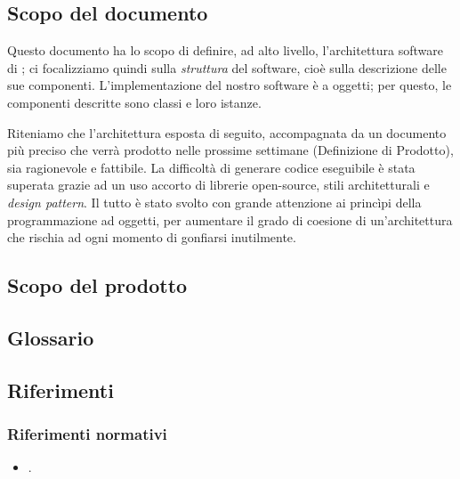 


\subsection{Scopo del documento}
Questo documento ha lo scopo di definire, ad alto livello, l'architettura software di \proj; ci focalizziamo quindi sulla \emph{struttura} del software, cioè sulla descrizione delle sue componenti. L'implementazione del nostro software è a oggetti; per questo, le componenti descritte sono classi e loro istanze.

Riteniamo che l'architettura esposta di seguito, accompagnata da un documento più preciso che verrà prodotto nelle prossime settimane (Definizione di Prodotto), sia ragionevole e fattibile. La difficoltà di generare codice eseguibile è stata superata grazie ad un uso accorto di librerie open-source, stili architetturali e \emph{design pattern}. Il tutto è stato svolto con grande attenzione ai princìpi della programmazione ad oggetti, per aumentare il grado di coesione di un'architettura che rischia ad ogni momento di gonfiarsi inutilmente.


\subsection{Scopo del prodotto}
\scopo

\subsection{Glossario}
\presgloss

\subsection{Riferimenti} \label{sec:ref}

\subsubsection{Riferimenti normativi}
\begin{itemize}
	\item \NdP.
\end{itemize}


